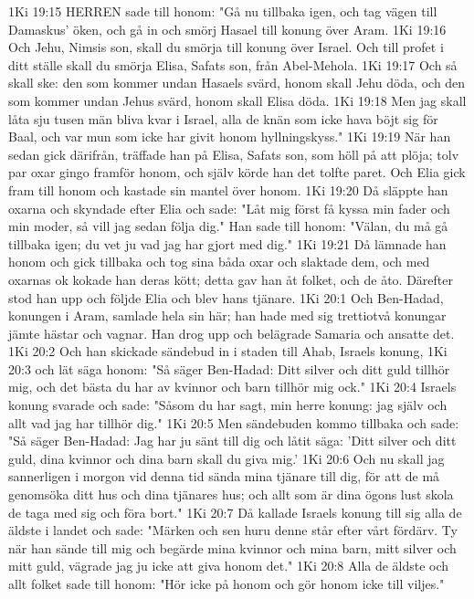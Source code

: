 1Ki 19:15  HERREN sade till honom: "Gå nu tillbaka igen, och tag vägen till Damaskus' öken, och gå in och smörj Hasael till konung över Aram.
1Ki 19:16  Och Jehu, Nimsis son, skall du smörja till konung över Israel. Och till profet i ditt ställe skall du smörja Elisa, Safats son, från Abel-Mehola.
1Ki 19:17  Och så skall ske: den som kommer undan Hasaels svärd, honom skall Jehu döda, och den som kommer undan Jehus svärd, honom skall Elisa döda.
1Ki 19:18  Men jag skall låta sju tusen män bliva kvar i Israel, alla de knän som icke hava böjt sig för Baal, och var mun som icke har givit honom hyllningskyss."
1Ki 19:19  När han sedan gick därifrån, träffade han på Elisa, Safats son, som höll på att plöja; tolv par oxar gingo framför honom, och själv körde han det tolfte paret. Och Elia gick fram till honom och kastade sin mantel över honom.
1Ki 19:20  Då släppte han oxarna och skyndade efter Elia och sade: "Låt mig först få kyssa min fader och min moder, så vill jag sedan följa dig." Han sade till honom: "Välan, du må gå tillbaka igen; du vet ju vad jag har gjort med dig."
1Ki 19:21  Då lämnade han honom och gick tillbaka och tog sina båda oxar och slaktade dem, och med oxarnas ok kokade han deras kött; detta gav han åt folket, och de åto. Därefter stod han upp och följde Elia och blev hans tjänare.
1Ki 20:1  Och Ben-Hadad, konungen i Aram, samlade hela sin här; han hade med sig trettiotvå konungar jämte hästar och vagnar. Han drog upp och belägrade Samaria och ansatte det.
1Ki 20:2  Och han skickade sändebud in i staden till Ahab, Israels konung,
1Ki 20:3  och lät säga honom: "Så säger Ben-Hadad: Ditt silver och ditt guld tillhör mig, och det bästa du har av kvinnor och barn tillhör mig ock."
1Ki 20:4  Israels konung svarade och sade: "Såsom du har sagt, min herre konung: jag själv och allt vad jag har tillhör dig."
1Ki 20:5  Men sändebuden kommo tillbaka och sade: "Så säger Ben-Hadad: Jag har ju sänt till dig och låtit säga: 'Ditt silver och ditt guld, dina kvinnor och dina barn skall du giva mig.'
1Ki 20:6  Och nu skall jag sannerligen i morgon vid denna tid sända mina tjänare till dig, för att de må genomsöka ditt hus och dina tjänares hus; och allt som är dina ögons lust skola de taga med sig och föra bort."
1Ki 20:7  Då kallade Israels konung till sig alla de äldste i landet och sade: "Märken och sen huru denne står efter vårt fördärv. Ty när han sände till mig och begärde mina kvinnor och mina barn, mitt silver och mitt guld, vägrade jag ju icke att giva honom det."
1Ki 20:8  Alla de äldste och allt folket sade till honom: "Hör icke på honom och gör honom icke till viljes."

